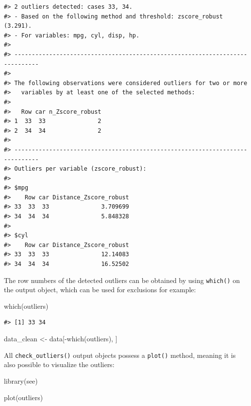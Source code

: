 \documentclass{article}
\newenvironment{Shaded}{\begin{snugshade}}{\end{snugshade}}
\newcommand{\FunctionTok}[1]{\textcolor[rgb]{0.00,0.00,0.00}{#1}}
\newcommand{\NormalTok}[1]{#1}
\newcommand{\OtherTok}[1]{\textcolor[rgb]{0.56,0.35,0.01}{#1}}
\newcommand{\SpecialCharTok}[1]{\textcolor[rgb]{0.00,0.00,0.00}{#1}}
\begin{document}
\begin{verbatim}
#> 2 outliers detected: cases 33, 34.
#> - Based on the following method and threshold: zscore_robust (3.291).
#> - For variables: mpg, cyl, disp, hp.
#> 
#> -----------------------------------------------------------------------------
#>  
#> The following observations were considered outliers for two or more
#>   variables by at least one of the selected methods:
#> 
#>   Row car n_Zscore_robust
#> 1  33  33               2
#> 2  34  34               2
#> 
#> -----------------------------------------------------------------------------
#> Outliers per variable (zscore_robust): 
#> 
#> $mpg
#>    Row car Distance_Zscore_robust
#> 33  33  33               3.709699
#> 34  34  34               5.848328
#> 
#> $cyl
#>    Row car Distance_Zscore_robust
#> 33  33  33               12.14083
#> 34  34  34               16.52502
\end{verbatim}

The row numbers of the detected outliers can be obtained by using
\texttt{which()} on the output object, which can be used for exclusions
for example:

\begin{Shaded}
\begin{Highlighting}[]
\FunctionTok{which}\NormalTok{(outliers)}
\end{Highlighting}
\end{Shaded}

\begin{verbatim}
#> [1] 33 34
\end{verbatim}

\begin{Shaded}
\begin{Highlighting}[]
\NormalTok{data\_clean }\OtherTok{\textless{}{-}}\NormalTok{ data[}\SpecialCharTok{{-}}\FunctionTok{which}\NormalTok{(outliers), ]}
\end{Highlighting}
\end{Shaded}

All \texttt{check\_outliers()} output objects possess a \texttt{plot()}
method, meaning it is also possible to visualize the outliers:

\begin{Shaded}
\begin{Highlighting}[]
\FunctionTok{library}\NormalTok{(see)}

\FunctionTok{plot}\NormalTok{(outliers)}
\end{Highlighting}
\end{Shaded}
\end{document}

